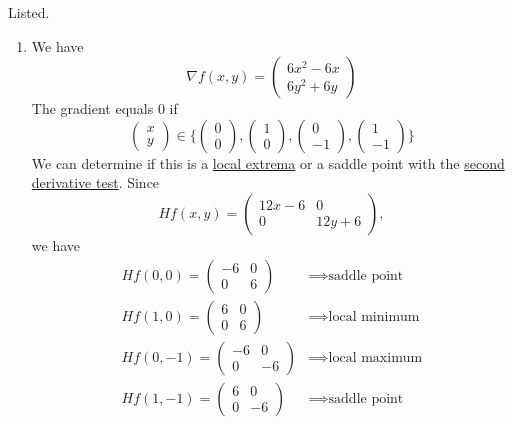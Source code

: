 	\begin{solution}
	  Listed. 
		\begin{enumerate}
		  \item We have 
				\begin{equation}
					\nabla f(x, y) = \begin{pmatrix} 6x^2 - 6x \\ 6y^2 + 6y \end{pmatrix}
				\end{equation}
				The gradient equals $0$ if 
				\begin{equation}
					\begin{pmatrix} x \\ y \end{pmatrix} \in \bigg\{ 
						\begin{pmatrix} 0 \\ 0 \end{pmatrix}, 
						\begin{pmatrix} 1 \\ 0 \end{pmatrix}, 
						\begin{pmatrix} 0 \\ -1 \end{pmatrix}, 
						\begin{pmatrix} 1 \\ -1 \end{pmatrix}
					\bigg\}
				\end{equation}
				We can determine if this is a \hyperref[pst-def:local_extrema]{local extrema} or a saddle point with the \hyperref[real-thm:second-der-test]{second derivative test}. Since 
				\begin{equation}
					Hf(x, y) = \begin{pmatrix} 12x - 6 & 0 \\ 0 & 12y + 6 \end{pmatrix}, 
				\end{equation} 
				we have 
				\begin{align}
					Hf(0, 0) = \begin{pmatrix} -6 & 0 \\ 0 & 6 \end{pmatrix} & \implies \text{saddle point} \\ 
					Hf(1, 0) = \begin{pmatrix} 6 & 0 \\ 0 & 6 \end{pmatrix} & \implies \text{local minimum} \\ 
					Hf(0, -1) = \begin{pmatrix} -6 & 0 \\ 0 & -6 \end{pmatrix} & \implies \text{local maximum} \\ 
					Hf(1, -1) = \begin{pmatrix} 6 & 0 \\ 0 & -6 \end{pmatrix} & \implies \text{saddle point}
				\end{align}


\end{enumerate}
\end{solution}
